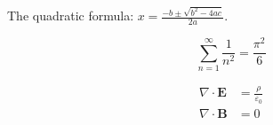 \documentclass{article}
\begin{document}
The quadratic formula: $x = \frac{-b \pm \sqrt{b^2 - 4ac}}{2a}$. %

\[
  \sum_{n=1}^{\infty} \frac{1}{n^2} = \frac{\pi^2}{6}
\]

\begin{align}
  \nabla \cdot \mathbf{E} &= \frac{\rho}{\varepsilon_0} \\
  \nabla \cdot \mathbf{B} &= 0
\end{align}
\end{document}
